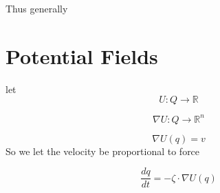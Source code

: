 \documentclass[a4paper]{article}
\begin{document}
Thus generally 

\section{Potential Fields}
let 
\begin{equation}
U: Q \rightarrow \mathbb{R}
\end{equation}

\begin{equation}
\nabla U: Q \rightarrow \mathbb{R}^{n} 
\end{equation}

\begin{equation}
\nabla U(q) = v
\end{equation}
So we let the velocity be proportional to force

\begin{equation}
	\frac{dq}{dt} = -\zeta \cdot \nabla U(q)
\end{equation}
\end{document}
